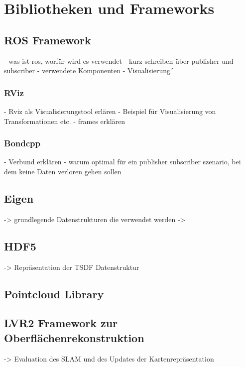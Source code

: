 \chapter{Bibliotheken und Frameworks}

\section{ROS Framework}

- was ist ros, worfür wird es verwendet
- kurz schreiben über publisher und subscriber
- verwendete Komponenten
- Visualisierung´

\subsection{RViz}

- Rviz als Visualisierungstool erlären
- Beispiel für Visualisierung von Transformationen etc.
- frames erklären

\subsection{Bondcpp}

- Verbund erklären
- warum optimal für ein publisher subscriber szenario, bei dem keine Daten verloren gehen sollen

\section{Eigen}

-> grundlegende Datenstrukturen die verwendet werden
-> 

\section{HDF5}

-> Repräsentation der TSDF Datenstruktur

\section{Pointcloud Library}

\section{LVR2 Framework zur Oberflächenrekonstruktion}

-> Evaluation des SLAM und des Updates der Kartenrepräsentation

